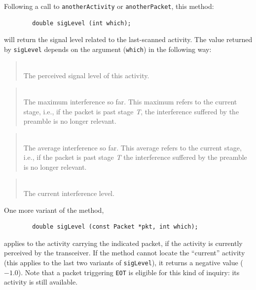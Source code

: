 Following a call to {\tt anotherActivity} or {\tt anotherPacket}, this method:
\begin{verbatim}
        double sigLevel (int which);
\end{verbatim}
\noindent
will return the signal level related to the last-scanned activity.
The value returned by {\tt sigLevel} depends on the argument 
({\tt which}) in the following way:

\begin{quote}
\noindent{}\\ \hspace{0in}
The perceived signal level of this activity.
\end{quote}

\begin{quote}
\noindent{}\\ \hspace{0in}
The maximum interference so far.
This maximum refers to the current stage, i.e.,
if the packet is past stage {\em T}, the interference suffered
by the preamble is no longer relevant.
\end{quote}

\begin{quote}
\noindent{}\\ \hspace{0in}
The average interference so far.
This average refers to the current stage, i.e.,
if the packet is past stage {\em T\/} the interference suffered
by the preamble is no longer relevant.
\end{quote}

\begin{quote}
\noindent{}\\ \hspace{0in}
The current interference level.
\end{quote}

One more variant of the method,
\begin{verbatim}
        double sigLevel (const Packet *pkt, int which);
\end{verbatim}
\noindent
applies to the activity carrying the indicated packet, if the activity is
currently perceived by the transceiver.
If the method cannot locate the ``current'' activity (this applies to the
last two variants of {\tt sigLevel}), it returns a negative value ($-1.0$).
Note that a packet triggering {\tt EOT} is eligible for this kind of
inquiry: its activity is still available.

